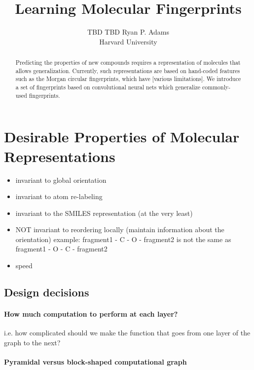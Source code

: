 \documentclass{article}
\title{Learning Molecular Fingerprints}
\author{
TBD
\And
TBD
\And
Ryan P. Adams\\
Harvard University
\And
}
\begin{document}
\maketitle

\begin{abstract}
Predicting the properties of new compounds requires a representation of molecules that allows generalization.
Currently, such representations are based on hand-coded features such as the Morgan circular fingerprints, which have [various limitations].
We introduce a set of fingerprints based on convolutional neural nets which generalize commonly-used fingerprints.
\end{abstract}



\section{Desirable Properties of Molecular Representations}

\begin{itemize}

\item invariant to global orientation
\item invariant to atom re-labeling
\item invariant to the SMILES representation (at the very least)
\item NOT invariant to reordering locally (maintain information about the orientation)
    example:  fragment1 - C - O - fragment2 is not the same as fragment1 - O - C - fragment2 
   \item speed
\end{itemize}

\subsection{Design decisions}

\paragraph{How much computation to perform at each layer?}
i.e. how complicated should we make the function that goes from one layer of the graph to the next?

\paragraph{Pyramidal versus block-shaped computational graph}
\end{document}
